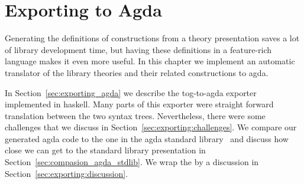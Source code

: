 \chapter{Exporting to Agda}
\label{ch:export}


Generating the definitions of constructions from a theory presentation saves a lot of library development time, but having these definitions in a feature-rich language makes it even more useful. In this chapter we implement an automatic translator of the library theories and their related constructions to agda.

In Section~\ref{sec:exporting_agda} we describe the tog-to-agda exporter implemented in haskell. Many parts of this exporter were straight forward translation between the two syntax trees. Nevertheless, there were some challenges that we discuss in Section~\ref{sec:exporting:challenges}. We compare our generated agda code to the one in the agda standard library~\cite{agda_stdlib} and discuss how close we can get to the standard library presentation in Section~\ref{sec:compasion_agda_stdlib}. 
We wrap the by a discussion in Section~\ref{sec:exporting:discussion}. 

\begin{comment}
One of the problems we highlight here is how design decisions lead to different presentations of the same theory, forcing developers to rewrite the same mathematical knowledge in different ways. In this chapter, we investigate the following question
\begin{itemize}
\item Given the tog abstract representation, can we export to formal systems with more complex meta theory and design decision. 
\end{itemize}
\end{comment}

